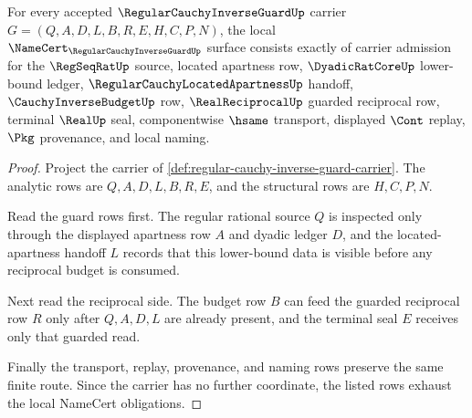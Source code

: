 \begin{theorem}
\label{thm:regular-cauchy-inverse-guard-namecert-obligations}
For every accepted $\RegularCauchyInverseGuardUp$ carrier $G=(Q,A,D,L,B,R,E,H,C,P,N)$, the local $\NameCert_{\RegularCauchyInverseGuardUp}$ surface consists exactly of carrier admission for the $\RegSeqRatUp$ source, located apartness row, $\DyadicRatCoreUp$ lower-bound ledger, $\RegularCauchyLocatedApartnessUp$ handoff, $\CauchyInverseBudgetUp$ row, $\RealReciprocalUp$ guarded reciprocal row, terminal $\RealUp$ seal, componentwise $\hsame$ transport, displayed $\Cont$ replay, $\Pkg$ provenance, and local naming.
\end{theorem}
\begin{proof}
Project the carrier of \autoref{def:regular-cauchy-inverse-guard-carrier}. The analytic rows are $Q,A,D,L,B,R,E$, and the structural rows are $H,C,P,N$.

Read the guard rows first. The regular rational source $Q$ is inspected only through the displayed apartness row $A$ and dyadic ledger $D$, and the located-apartness handoff $L$ records that this lower-bound data is visible before any reciprocal budget is consumed.

Next read the reciprocal side. The budget row $B$ can feed the guarded reciprocal row $R$ only after $Q,A,D,L$ are already present, and the terminal seal $E$ receives only that guarded read.

Finally the transport, replay, provenance, and naming rows preserve the same finite route. Since the carrier has no further coordinate, the listed rows exhaust the local NameCert obligations.
\end{proof}

